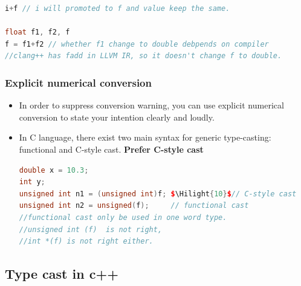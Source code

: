 \documentclass[a4paper,12pt,twoside]{book}
\newcommand{\Hilight}[1]{\makebox[0pt][l]{\color{yellow}\rule[-3pt]{#1em}{11pt}}}
\begin{document}
\begin{itemize}
\begin{lstlisting}[frame=single, language=c++, mathescape=true]
i+f // i will promoted to f and value keep the same.

float f1, f2, f
f = f1+f2 // whether f1 change to double debpends on compiler
//clang++ has fadd in LLVM IR, so it doesn't change f to double.
\end{lstlisting}
\end{itemize}

\subsubsection{Explicit numerical conversion}
\begin{itemize}
\item In order to suppress conversion warning, you can use explicit numerical conversion to state your intention clearly and loudly.

\item In C language, there exist two main syntax for generic type-casting: functional and C-style cast.  \textbf{Prefer C-style cast}

\begin{lstlisting}[frame=single, language=c++, mathescape=true]
double x = 10.3;
int y;
unsigned int n1 = (unsigned int)f; $\Hilight{10}$// C-style cast
unsigned int n2 = unsigned(f);     // functional cast
//functional cast only be used in one word type.
//unsigned int (f)  is not right,
//int *(f) is not right either.
\end{lstlisting}

\end{itemize}

\subsection{Type cast in c++}
\end{document}

